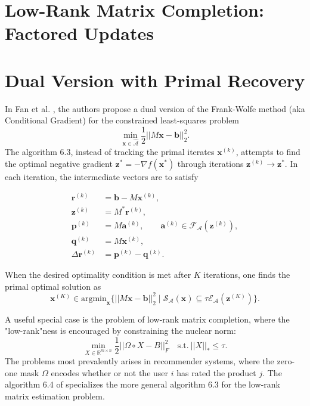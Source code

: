 \documentclass[12pt]{article}
\begin{document}
\section{Low-Rank Matrix Completion: Factored Updates}

\section{Dual Version with Primal Recovery}
In Fan et al. \cite{FJSF}, the authors propose a dual version of the Frank-Wolfe method (aka Conditional Gradient) for the constrained least-squares problem
\begin{equation*}
    \min_{\mathbf{x} \in \hat{\mathcal{A}}} \frac{1}{2} ||M\mathbf{x} - \mathbf{b}||_2^2.
\end{equation*}
The algorithm 6.3, instead of tracking the primal iterates $\mathbf{x}^{(k)}$, attempts to find the optimal negative gradient $\mathbf{z}^{*} = - \nabla f(\mathbf{x}^{*})$ through iterations $\mathbf{z}^{(k)} \rightarrow \mathbf{z}^{*}$. In each iteration, the intermediate vectors are to satisfy

    \begin{align*}
        \mathbf{r}^{(k)} &= \mathbf{b} - M \mathbf{x}^{(k)}, \\
        \mathbf{z}^{(k)} &= M^* \mathbf{r}^{(k)}, \\
        \mathbf{p}^{(k)} &= M\mathbf{a}^{(k)}, \quad \quad \mathbf{a}^{(k)} \in \mathcal{F}_{\mathcal{A}}(\mathbf{z}^{(k)}), \\
        \mathbf{q}^{(k)} &= M\mathbf{x}^{(k)}, \\
        \Delta \mathbf{r}^{(k)} &= \mathbf{p}^{(k)} - \mathbf{q}^{(k)}.
    \end{align*}

When the desired optimality condition is met after $K$ iterations, one finds the primal optimal solution as
\begin{equation*}
    \mathbf{x}^{(K)} \in \mathrm{argmin}_{\mathbf{x}} \{||M\mathbf{x} - \mathbf{b}||_2^2 \; | \; \mathcal{S}_{\mathcal{A}}(\mathbf{x}) \subseteq \tau \mathcal{E}_{\mathcal{A}}(\mathbf{z}^{(K)})\}.
\end{equation*}

A useful special case is the problem of low-rank matrix completion, where the "low-rank"ness is encouraged by constraining the nuclear norm:
\begin{equation*}
    \min_{X \in \mathbb{R}^{m \times n}} \frac{1}{2} ||\Omega \circ X - B||_{F}^2 \quad \mathrm{s.t.} \: ||X||_{*} \leq \tau.
\end{equation*}
The problems most prevalently arises in recommender systems, where the zero-one mask $\Omega$ encodes whether or not the user $i$ has rated the product $j$. The algorithm 6.4 of \cite{FJSF} specializes the more general algorithm 6.3 for the low-rank matrix estimation problem.
\end{document}
